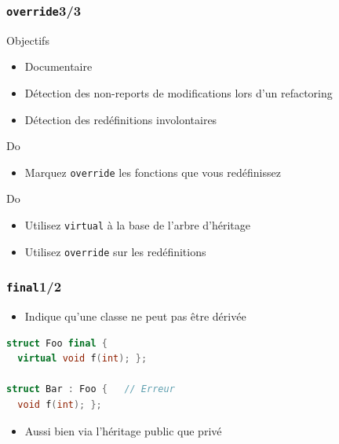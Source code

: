 \documentclass[C++.tex]{subfiles}
\begin{document}
\begin{frame}[fragile]
	\frametitle{\lstinline|override|\titlehfill{}3/3}
	\begin{block}{Objectifs}
		\begin{itemize}
			\item Documentaire
			\item Détection des non-reports de modifications lors d'un refactoring
			\item Détection des redéfinitions involontaires
		\end{itemize}
	\end{block}

	\begin{exampleblock}{Do}
		\begin{itemize}
			\item Marquez \lstinline|override| les fonctions que vous redéfinissez
		\end{itemize}
	\end{exampleblock}

	\begin{exampleblock}{Do}
		\begin{itemize}
			\item Utilisez \lstinline|virtual| à la base de l'arbre d'héritage
			\item Utilisez \lstinline|override| sur les redéfinitions
		\end{itemize}

	\end{exampleblock}
\end{frame}

\begin{frame}[fragile]
	\frametitle{\lstinline|final|\titlehfill{}1/2}
	\begin{itemize}
		\item Indique qu'une classe ne peut pas être dérivée
	\end{itemize}

	\begin{lstlisting}[language=C++]
struct Foo final {
  virtual void f(int); };

struct Bar : Foo {   // Erreur
  void f(int); };
\end{lstlisting}

	\begin{itemize}
		\item Aussi bien via l'héritage public que privé
	\end{itemize}
\end{frame}
\end{document}
